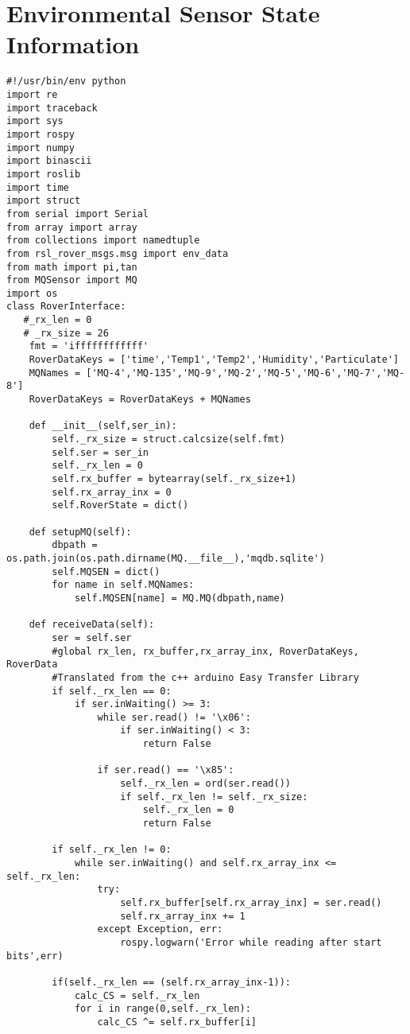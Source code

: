 \section{Environmental Sensor State Information}
\begin{verbatim}
#!/usr/bin/env python
import re
import traceback
import sys
import rospy
import numpy
import binascii
import roslib
import time
import struct
from serial import Serial
from array import array
from collections import namedtuple
from rsl_rover_msgs.msg import env_data
from math import pi,tan
from MQSensor import MQ
import os
class RoverInterface: 
   #_rx_len = 0
   # _rx_size = 26
    fmt = 'iffffffffffff'
    RoverDataKeys = ['time','Temp1','Temp2','Humidity','Particulate']
    MQNames = ['MQ-4','MQ-135','MQ-9','MQ-2','MQ-5','MQ-6','MQ-7','MQ-8']
    RoverDataKeys = RoverDataKeys + MQNames

    def __init__(self,ser_in):
        self._rx_size = struct.calcsize(self.fmt)
        self.ser = ser_in
        self._rx_len = 0
        self.rx_buffer = bytearray(self._rx_size+1)
        self.rx_array_inx = 0
        self.RoverState = dict()

    def setupMQ(self):
        dbpath = os.path.join(os.path.dirname(MQ.__file__),'mqdb.sqlite')
        self.MQSEN = dict()
        for name in self.MQNames:
            self.MQSEN[name] = MQ.MQ(dbpath,name)

    def receiveData(self):
        ser = self.ser
        #global rx_len, rx_buffer,rx_array_inx, RoverDataKeys, RoverData
        #Translated from the c++ arduino Easy Transfer Library
        if self._rx_len == 0:
            if ser.inWaiting() >= 3:
                while ser.read() != '\x06':
                    if ser.inWaiting() < 3:
                        return False

                if ser.read() == '\x85':
                    self._rx_len = ord(ser.read())
                    if self._rx_len != self._rx_size:
                        self._rx_len = 0
                        return False
        
        if self._rx_len != 0:
            while ser.inWaiting() and self.rx_array_inx <= self._rx_len:
                try:
                    self.rx_buffer[self.rx_array_inx] = ser.read()
                    self.rx_array_inx += 1
                except Exception, err:
                    rospy.logwarn('Error while reading after start bits',err)

        if(self._rx_len == (self.rx_array_inx-1)):
            calc_CS = self._rx_len
            for i in range(0,self._rx_len):
                calc_CS ^= self.rx_buffer[i]


\end{verbatim}
